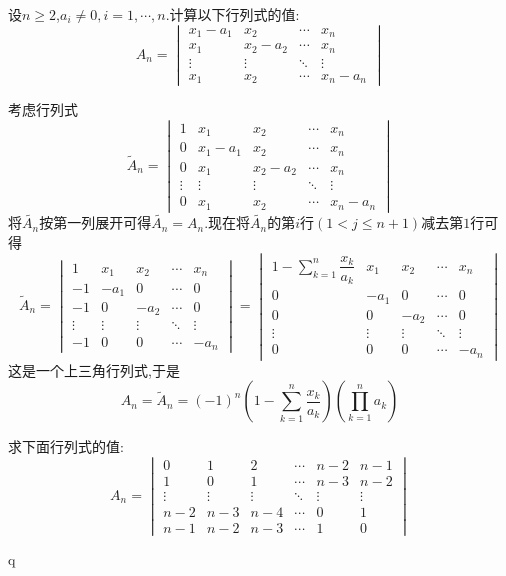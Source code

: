 \documentclass{ctexart}
\begin{document}
\begin{problem}
    设$n\geqslant2$,$a_i\neq0,i=1,\cdots,n$.计算以下行列式的值:
    \[A_n=\begin{vmatrix}
        x_1-a_1&x_2&\cdots&x_n\\
        x_1&x_2-a_2&\cdots&x_n\\
        \vdots&\vdots&\ddots&\vdots\\
        x_1&x_2&\cdots&x_n-a_n
    \end{vmatrix}\]
\end{problem}
\begin{solution}
    考虑行列式
    \[\tilde{A}_n=\begin{vmatrix}
        1&x_1&x_2&\cdots&x_n\\
        0&x_1-a_1&x_2&\cdots&x_n\\
        0&x_1&x_2-a_2&\cdots&x_n\\
        \vdots&\vdots&\vdots&\ddots&\vdots\\
        0&x_1&x_2&\cdots&x_n-a_n
    \end{vmatrix}\]
    将$\tilde{A_n}$按第一列展开可得$\tilde{A_n}=A_n$.现在将$\tilde{A_n}$的第$i$行$(1<j\leqslant n+1)$减去第$1$行可得
    \[\tilde{A}_n=\begin{vmatrix}
        1&x_1&x_2&\cdots&x_n\\
        -1&-a_1&0&\cdots&0\\
        -1&0&-a_2&\cdots&0\\
        \vdots&\vdots&\vdots&\ddots&\vdots\\
        -1&0&0&\cdots&-a_n
    \end{vmatrix}=\begin{vmatrix}
        \displaystyle1-\sum_{k=1}^{n}\dfrac{x_k}{a_k}&x_1&x_2&\cdots&x_n\\
        0&-a_1&0&\cdots&0\\
        0&0&-a_2&\cdots&0\\
        \vdots&\vdots&\vdots&\ddots&\vdots\\
        0&0&0&\cdots&-a_n
    \end{vmatrix}\]
    这是一个上三角行列式,于是
    \[A_n=\tilde{A}_n=(-1)^{n}\left(1-\sum_{k=1}^{n}\dfrac{x_k}{a_k}\right)\left(\prod_{k=1}^{n}a_k\right)\]
\end{solution}
\begin{problem}
    求下面行列式的值:
    \[A_n=\begin{vmatrix}
        0&1&2&\cdots&n-2&n-1\\
        1&0&1&\cdots&n-3&n-2\\
        \vdots&\vdots&\vdots&\ddots&\vdots&\vdots\\
        n-2&n-3&n-4&\cdots&0&1\\
        n-1&n-2&n-3&\cdots&1&0
    \end{vmatrix}\]
\end{problem}
\begin{solution}
    q
\end{solution}
\end{document}
